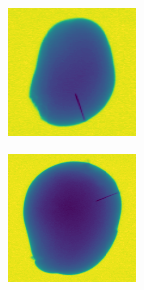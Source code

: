 \documentclass[11pt]{article}
\begin{document}
\begin{figure}[!h]
\begin{subfigure}[b]{0.22\textwidth}
         \caption{}
         \label{fig:metal_3}
     \end{subfigure}
     \\
    \begin{subfigure}[b]{0.22\textwidth}
         \centering
         \includegraphics[width=\textwidth]{figurer/potato_dataset/metal/metal_4.jpg}
         \caption{}
         \label{fig:metal_4}
     \end{subfigure}
     \hfill
     \begin{subfigure}[b]{0.22\textwidth}
         \centering
         \includegraphics[width=\textwidth]{figurer/potato_dataset/metal/metal_5.jpg}

\end{subfigure}
\end{figure}
\end{document}

